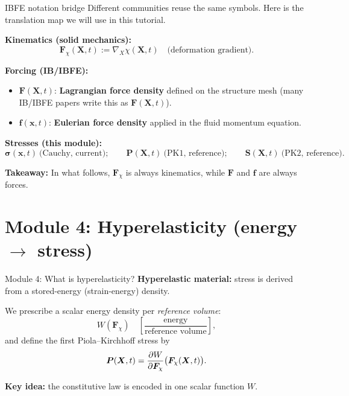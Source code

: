 \documentclass[aspectratio=169]{beamer}
\newcommand{\x}{\bm{x}}
\newcommand{\X}{\bm{X}}
\newcommand{\gradX}{\nabla_{\!X}}
\newcommand{\sigmaC}{\bm{\sigma}} %
\newcommand{\Sten}{\bm{S}}     %
\newcommand{\Fdef}{\bm{F}_{\chi}}  %
\newcommand{\Pten}{\bm{P}}         %
\newcommand{\fEuler}{\bm{f}}       %
\newcommand{\FLag}{\bm{F}}         %
\begin{document}
\begin{frame}{IBFE notation bridge}
\small
Different communities reuse the same symbols. Here is the translation map we will use in this tutorial.

\medskip
\textbf{Kinematics (solid mechanics):}
\[
\Fdef(\X,t) := \gradX \chi(\X,t)
\quad\text{(deformation gradient).}
\]

\medskip
\textbf{Forcing (IB/IBFE):}
\begin{itemize}
\item \(\FLag(\X,t)\): \textbf{Lagrangian force density} defined on the structure mesh (many IB/IBFE papers write this as \(\bm{F}(\X,t)\)).
\item \(\fEuler(\x,t)\): \textbf{Eulerian force density} applied in the fluid momentum equation.
\end{itemize}

\medskip
\textbf{Stresses (this module):}
\[
\sigmaC(\x,t)\ \text{(Cauchy, current)};\qquad
\Pten(\X,t)\ \text{(PK1, reference)};\qquad
\Sten(\X,t)\ \text{(PK2, reference)}.
\]

\medskip
\textbf{Takeaway:} In what follows, \(\Fdef\) is always kinematics, while \(\FLag\) and \(\fEuler\) are always forces.
\end{frame}

\section{Module 4: Hyperelasticity (energy \texorpdfstring{$\to$}{->} stress)}

\begin{frame}{Module 4: What is hyperelasticity?}
\small
\textbf{Hyperelastic material:} stress is derived from a stored-energy (strain-energy) density.

\medskip
We prescribe a scalar energy density per \emph{reference volume}:
\[
W(\Fdef) \quad \left[\frac{\text{energy}}{\text{reference volume}}\right],
\]
and define the first Piola--Kirchhoff stress by
\[
\Pten(\X,t) = \pdv{W}{\Fdef}\big(\Fdef(\X,t)\big).
\]

\medskip
\textbf{Key idea:} the constitutive law is encoded in one scalar function \(W\).


\end{frame}
\end{document}
